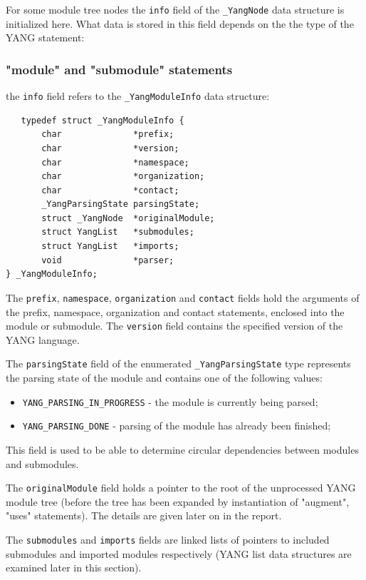 \documentclass[conference]{IEEEtran}
\begin{document}
For some module tree nodes the \texttt{info} field of the \texttt{\_YangNode} data structure is initialized here. What data is stored in this field depends on the the type of the YANG statement:
\subsubsection{"module" and "submodule" statements}
the \texttt{info} field refers to the \texttt{\_YangModuleInfo} data structure:

\small
\begin{verbatim}
   typedef struct _YangModuleInfo {
       char              *prefix;
       char              *version;
       char              *namespace;
       char              *organization;
       char              *contact;
       _YangParsingState parsingState;
       struct _YangNode  *originalModule;
       struct YangList   *submodules;
       struct YangList   *imports;
       void              *parser;
} _YangModuleInfo;
\end{verbatim}
\normalsize
The \texttt{prefix}, \texttt{namespace}, \texttt{organization} and \texttt{contact} fields hold the arguments of the prefix, namespace, organization and contact statements,
enclosed into the module or submodule. The \texttt{version} field contains the specified version of the YANG language.

The \texttt{parsingState} field of the enumerated \texttt{\_YangParsingState} type represents the parsing state of the module and contains one of the following values:
\begin{itemize}
\item \texttt{YANG\_PARSING\_IN\_PROGRESS} - the module is currently being parsed;
\item \texttt{YANG\_PARSING\_DONE} - parsing of the module has already been finished;
\end{itemize}
This field is used to be able to determine circular dependencies between modules and submodules.

The \texttt{originalModule} field holds a pointer to the root of the unprocessed YANG module tree (before the tree has been expanded
by instantiation of "augment", "uses" statements). The details are given later on in the report.

The \texttt{submodules} and \texttt{imports} fields are linked lists of pointers to included submodules and imported modules respectively (YANG list data structures are examined later in this section).
\end{document}
